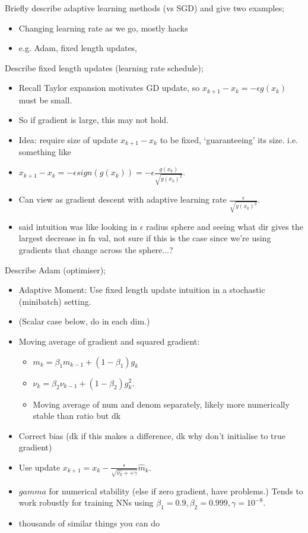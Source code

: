 \documentclass{article}
\begin{document}
Briefly describe adaptive learning methods (vs SGD) and give two examples; \begin{itemize}
	\item Changing learning rate as we go, mostly hacks
	\item e.g. Adam, fixed length updates, 
\end{itemize}

Describe fixed length updates (learning rate schedule); \begin{itemize}
	\item Recall Taylor expansion motivates GD update, so $x_{k+1}-x_k = -\epsilon g(x_k)$ must be small. 
	\item So if gradient is large, this may not hold.
	\item Idea: require size of update $x_{k+1}-x_k$ to be fixed, `guaranteeing' its size. i.e. something like 
	\item $x_{k+1}-x_k = -\epsilon sign (g(x_k))=-\epsilon \frac{g(x_k)}{\sqrt{g(x_k)^2}}$.
	\item Can view as gradient descent with adaptive learning rate $\frac{\epsilon}{\sqrt{g(x_k)^2}}$.
	\item said intuition was like looking in $\epsilon$ radius sphere and seeing what dir gives the largest decrease in fn val, not sure if this is the case since we're using gradients that change across the sphere...?
\end{itemize}

Describe Adam (optimiser); \begin{itemize}
	\item Adaptive Moment: Use fixed length update intuition in a stochastic (minibatch) setting.
	\item (Scalar case below, do in each dim.)
	\item Moving average of gradient and squared gradient: \begin{itemize}
		\item $m_k = \beta_1m_{k-1}+(1-\beta_1)g_k$
		\item $\nu_k = \beta_2\nu_{k-1} + (1-\beta_2)g_k^2$.
		\item Moving average of num and denom separately, likely more numerically stable than ratio but dk
	\end{itemize}
	\item Correct bias (dk if this makes a difference, dk why don't initialise to true gradient)
	\item Use update $x_{k+1}=x_k - \frac{\epsilon}{\sqrt{\hat{\nu_k}++\gamma}}\hat{m}_k$.
	\item $gamma$ for numerical stability (else if zero gradient, have problems.) Tends to work robustly for training NNs using $\beta_1 = 0.9, \beta_2 = 0.999, \gamma = 10^{-8}$.
	\item thousands of similar things you can do
\end{itemize}
\end{document}
